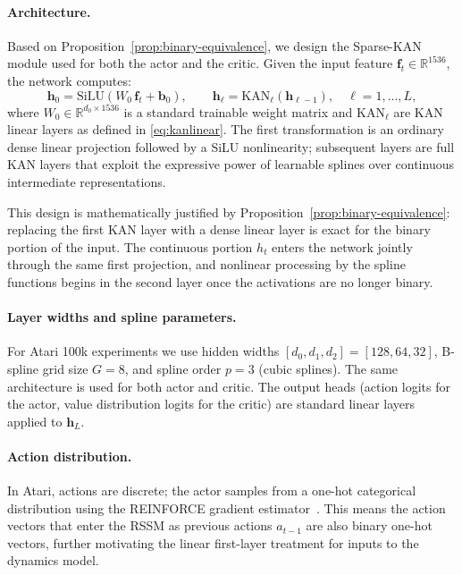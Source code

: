 \documentclass[11pt, a4paper]{article}
\begin{document}
\paragraph{Architecture.}
Based on Proposition~\ref{prop:binary-equivalence}, we design the Sparse-KAN
module used for both the actor and the critic. Given the input feature
$\mathbf{f}_t \in \mathbb{R}^{1536}$, the network computes:
\begin{equation}
  \mathbf{h}_0 = \mathrm{SiLU}(W_0\, \mathbf{f}_t + \mathbf{b}_0),
  \qquad
  \mathbf{h}_\ell = \mathrm{KAN}_\ell(\mathbf{h}_{\ell-1}), \quad \ell = 1, \ldots, L,
\end{equation}
where $W_0 \in \mathbb{R}^{d_0 \times 1536}$ is a standard trainable weight
matrix and $\mathrm{KAN}_\ell$ are KAN linear layers as defined in
\eqref{eq:kanlinear}. The first transformation is an ordinary dense linear
projection followed by a SiLU nonlinearity; subsequent layers are full KAN
layers that exploit the expressive power of learnable splines over continuous
intermediate representations.

This design is mathematically justified by Proposition~\ref{prop:binary-equivalence}:
replacing the first KAN layer with a dense linear layer is exact for the binary
portion of the input. The continuous portion $h_t$ enters the network jointly
through the same first projection, and nonlinear processing by the spline
functions begins in the second layer once the activations are no longer binary.

\paragraph{Layer widths and spline parameters.}
For Atari 100k experiments we use hidden widths $[d_0, d_1, d_2] = [128, 64,
32]$, B-spline grid size $G = 8$, and spline order $p = 3$ (cubic splines).
The same architecture is used for both actor and critic. The output heads
(action logits for the actor, value distribution logits for the critic) are
standard linear layers applied to $\mathbf{h}_L$.

\paragraph{Action distribution.}
In Atari, actions are discrete; the actor samples from a one-hot categorical
distribution using the REINFORCE gradient estimator~\cite{williams1992simple}.
This means the action vectors that enter the RSSM as previous actions $a_{t-1}$
are also binary one-hot vectors, further motivating the linear first-layer
treatment for inputs to the dynamics model.
\end{document}

